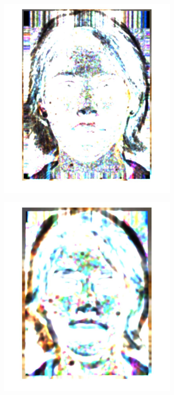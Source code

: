\documentclass[a4paper]{iacas}
\begin{document}
\begin{figure}[!htbp]
	
	\begin{subfigure}[b]{0.15\textwidth}
		\includegraphics[width=\textwidth]{201.jpg}
		\caption{}
		\label{fig:201}
	\end{subfigure}
	\begin{subfigure}[b]{0.15\textwidth}
		\includegraphics[width=\textwidth]{202.jpg}

\end{subfigure}
\end{figure}
\end{document}

